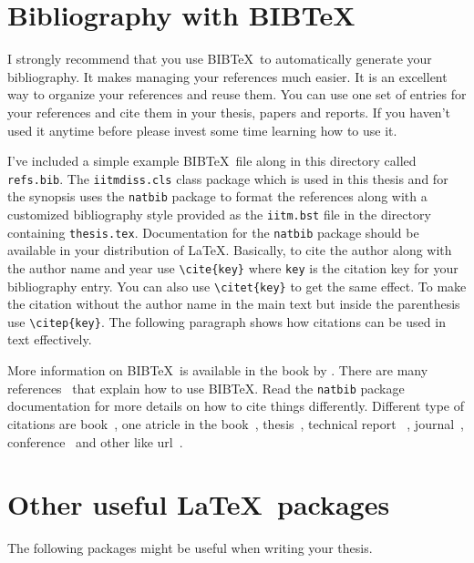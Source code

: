 \documentclass[MTech]{iitmdiss}
\begin{document}
 \section{Bibliography with BIB\TeX}
 
 I strongly recommend that you use BIB\TeX\ to automatically generate
 your bibliography.  It makes managing your references much easier.  It
 is an excellent way to organize your references and reuse them.  You
 can use one set of entries for your references and cite them in your
 thesis, papers and reports.  If you haven't used it anytime before
 please invest some time learning how to use it.  
 
 I've included a simple example BIB\TeX\ file along in this directory
 called \verb+refs.bib+.  The \verb+iitmdiss.cls+ class package which
 is used in this thesis and for the synopsis uses the \verb+natbib+
 package to format the references along with a customized bibliography
 style provided as the \verb+iitm.bst+ file in the directory containing
 \verb+thesis.tex+.  Documentation for the \verb+natbib+ package should
 be available in your distribution of \LaTeX.  Basically, to cite the
 author along with the author name and year use \verb+\cite{key}+ where
 \verb+key+ is the citation key for your bibliography entry.  You can
 also use \verb+\citet{key}+ to get the same effect.  To make the
 citation without the author name in the main text but inside the
 parenthesis use \verb+\citep{key}+.  The following paragraph shows how
 citations can be used in text effectively.
 
 More information on BIB\TeX\ is available in the book by
 \cite{lamport}.  There are many
 references~\citep{lamport, helmut, david} that explain how to use
 BIB\TeX.  Read the \verb+natbib+ package documentation for more
 details on how to cite things differently. Different type of citations are 
book~\cite{bellman}, one atricle in the book~\cite{Amarel:1968}, thesis~\cite{manning}, technical report
~\cite{Ravindran:proof}, journal~\cite{Barto:rtdp}, conference~\cite{knoblock90learning} and other like url~\cite{crawford92theoretical}.
 
 \section{Other useful \LaTeX\ packages}
 
 The following packages might be useful when writing your thesis.
 
\end{document}
